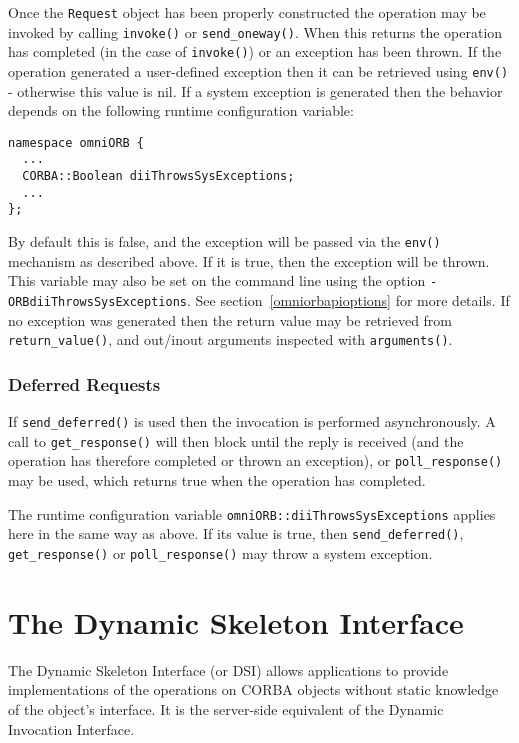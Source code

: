 \documentclass[11pt,twoside,onecolumn]{book}
\begin{document}
Once the {\tt Request} object has been properly constructed the operation
may be invoked by calling {\tt invoke()} or {\tt send\_oneway()}. When this
returns the operation has completed (in the case of {\tt invoke()}) or an
exception has been thrown. If the
operation generated a user-defined exception then it can be retrieved
using {\tt env()} - otherwise this value is nil. If a system exception is
generated then the behavior depends on the following runtime configuration
variable:

{\small \begin{verbatim}
namespace omniORB {
  ...
  CORBA::Boolean diiThrowsSysExceptions;
  ...
};
\end{verbatim}}
By default this is false, and the
exception will be passed via the {\tt env()} mechanism as described above.
If it is true, then the exception will be thrown. This variable may also be
set on the command line using the option {\tt -ORBdiiThrowsSysExceptions}.
See section~\ref{omniorbapioptions} for more details.
If no exception was generated then the return value may be retrieved from
{\tt return\_value()}, and out/inout arguments inspected with
{\tt arguments()}.


\subsection{Deferred Requests}

If {\tt send\_deferred()} is used then the invocation is performed
asynchronously. A call to {\tt get\_response()} will then block until the
reply is received (and the operation has therefore completed or thrown an
exception), or {\tt poll\_response()} may be used, which returns true when
the operation has completed.

The runtime configuration variable {\tt omniORB::diiThrowsSysExceptions}
applies here in the same way as above. If its value is true, then
{\tt send\_deferred()}, {\tt get\_response()} or {\tt poll\_response()} may
throw a system exception.


\chapter{The Dynamic Skeleton Interface}

The Dynamic Skeleton Interface (or DSI) allows applications to provide
implementations of the operations on CORBA objects without static
knowledge of the object's interface. It is the server-side equivalent of the
Dynamic Invocation Interface.
\end{document}
